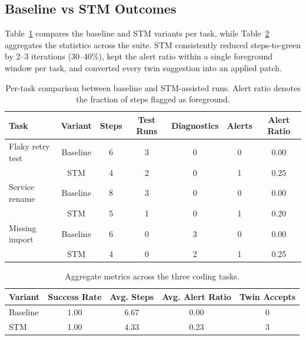 \documentclass[11pt]{article}
\begin{document}
\subsection{Baseline vs STM Outcomes}
Table~\ref{tab:codetrace-per-task} compares the baseline and STM variants per task, while Table~\ref{tab:codetrace-aggregate} aggregates the statistics across the suite. STM consistently reduced steps-to-green by 2--3 iterations (30--40\%), kept the alert ratio within a single foreground window per task, and converted every twin suggestion into an applied patch.

\begin{table}[h]
  \centering
  \caption{Per-task comparison between baseline and STM-assisted runs. Alert ratio denotes the fraction of steps flagged as foreground.}
  \label{tab:codetrace-per-task}
  \begin{tabular}{lcccccc}
    \toprule
    Task & Variant & Steps & Test Runs & Diagnostics & Alerts & Alert Ratio \\
    \midrule
    Flaky retry test & Baseline & 6 & 3 & 0 & 0 & 0.00 \\
                      & STM & 4 & 2 & 0 & 1 & 0.25 \\
    Service rename & Baseline & 8 & 3 & 0 & 0 & 0.00 \\
                   & STM & 5 & 1 & 0 & 1 & 0.20 \\
    Missing import & Baseline & 6 & 0 & 3 & 0 & 0.00 \\
                   & STM & 4 & 0 & 2 & 1 & 0.25 \\
    \bottomrule
  \end{tabular}
\end{table}

\begin{table}[h]
  \centering
  \caption{Aggregate metrics across the three coding tasks.}
  \label{tab:codetrace-aggregate}
  \begin{tabular}{lcccc}
    \toprule
    Variant & Success Rate & Avg. Steps & Avg. Alert Ratio & Twin Accepts \\
    \midrule
    Baseline & 1.00 & 6.67 & 0.00 & 0 \\
    STM & 1.00 & 4.33 & 0.23 & 3 \\
    \bottomrule
  \end{tabular}
\end{table}
\end{document}
